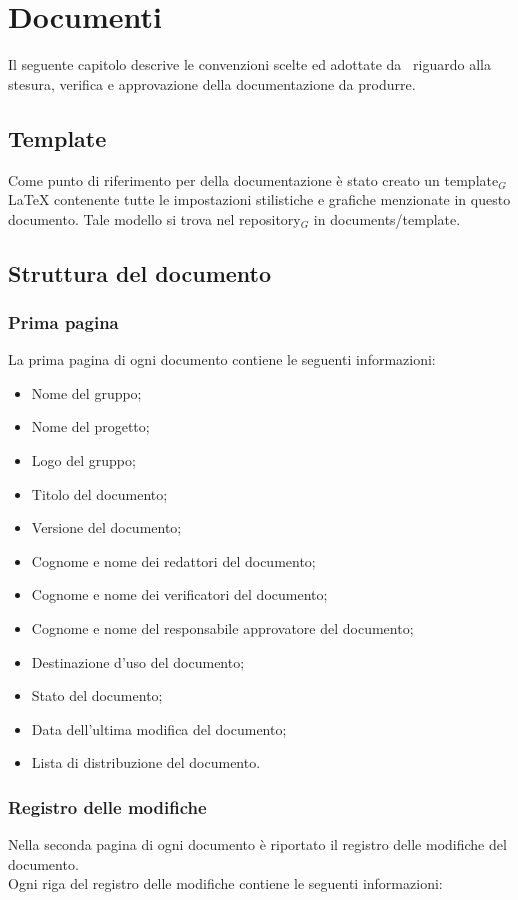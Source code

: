 \section{Documenti}
Il seguente capitolo descrive le convenzioni scelte ed adottate da \gruppo\ riguardo alla stesura, verifica e approvazione della documentazione da produrre.

\subsection{Template}
Come punto di riferimento per della documentazione è stato creato un template$_G$ \LaTeX{} contenente tutte le impostazioni stilistiche e grafiche menzionate in questo documento. Tale modello si trova nel repository$_{G}$ in documents/template.

\subsection{Struttura del documento}

\subsubsection{Prima pagina}
La prima pagina di ogni documento contiene le seguenti informazioni:
\smallbreak
\begin{itemize}
\item Nome del gruppo;
\item Nome del progetto;
\item Logo del gruppo;
\item Titolo del documento;
\item Versione del documento;
\item Cognome e nome dei redattori del documento;
\item Cognome e nome dei verificatori del documento;
\item Cognome e nome del responsabile approvatore del documento;
\item Destinazione d'uso del documento;
\item Stato del documento;
\item Data dell'ultima modifica del documento;
\item Lista di distribuzione del documento.
\end{itemize}

\subsubsection{Registro delle modifiche}
Nella seconda pagina di ogni documento è riportato il registro delle modifiche del documento. \\ 
Ogni riga del registro delle modifiche contiene le seguenti informazioni:

